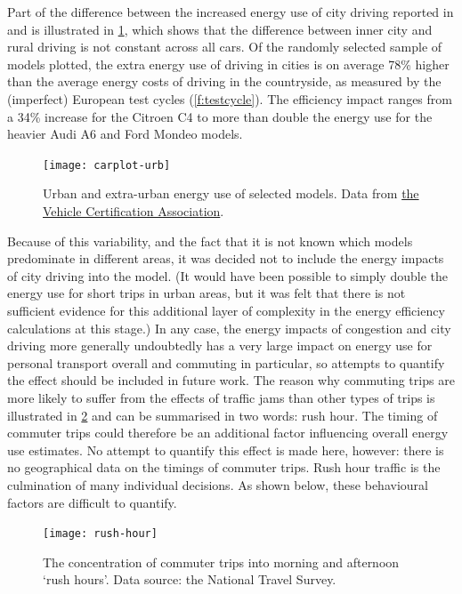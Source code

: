 Part of the difference between the increased energy use of city driving
reported in  \citet{Pelkmans2006} and \citet{Vlieger2000}
is illustrated in \cref{fcarplot-urb}, which shows that the
difference between inner
city and rural driving is not constant across all cars. Of the randomly
selected sample of models plotted, the extra energy use of driving in
cities is on average 78\% higher than the average energy costs of driving
in the countryside, as measured by the (imperfect) European test
cycles (\cref{f:testcycle}). The efficiency impact ranges from a
34\% increase for the
Citroen C4 to more than double the energy use for the heavier
Audi A6 and Ford Mondeo models.

\begin{figure}[h]
  \centerline{
    \texttt{[image: carplot-urb]}}
  \caption[Urban and extra-urban energy use of selected models]
  {Urban and extra-urban energy use of selected models.
  Data from \href{http://www.vcacarfueldata.org.uk/downloads/latest.asp}
  {the Vehicle Certification Association}.}
  \label{fcarplot-urb}
\end{figure}

Because of this variability, and the fact that it is not known which models
predominate in different areas, it was decided not to include the
energy impacts of city driving into the model.
(It would have been possible to simply double the energy use for
short trips in urban areas, but it was felt that there is not sufficient
evidence for this additional layer of complexity in the energy
efficiency calculations at this stage.)
In any case, the energy impacts of congestion and city driving
more generally undoubtedly has a very large impact on energy use for personal
transport overall and commuting in particular, so attempts to quantify the effect
should be included in future work. The reason why commuting trips are
more likely to suffer from the effects of traffic jams than other
types of trips is illustrated in \cref{frushhour} and can be summarised
in two words: rush hour. The timing of commuter trips could therefore be
an additional factor influencing overall energy use estimates. No attempt to
quantify this effect is made here, however: there is no geographical data on
the timings of commuter trips. Rush hour traffic is the culmination of many
individual decisions. As shown below, these behavioural factors are difficult
to quantify.

\begin{figure}[h]
  \centerline{
    \texttt{[image: rush-hour]}}
  \caption[The commuting `rush hours']
  {The concentration of commuter trips into morning
  and afternoon `rush hours'. Data source: the National Travel Survey.}
  \label{frushhour}
\end{figure}

